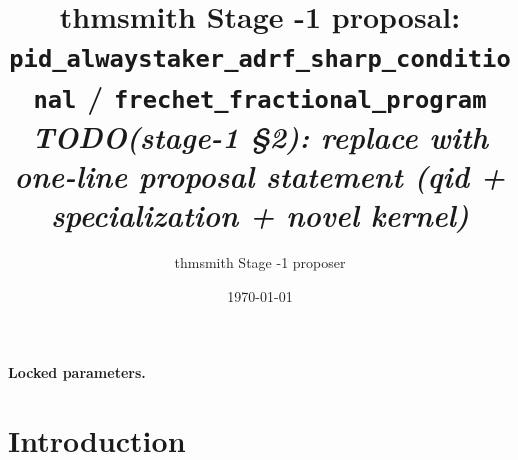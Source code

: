 \documentclass[11pt]{article}
\title{thmsmith Stage -1 proposal: \texttt{pid\_alwaystaker\_adrf\_sharp\_conditional} / \texttt{frechet\_fractional\_program}%
  \\ \large\textit{TODO(stage-1 \S2): replace with one-line proposal statement (qid + specialization + novel kernel)}}
\author{thmsmith Stage -1 proposer}
\date{\today}
\theoremstyle{definition}
\theoremstyle{plain}
\theoremstyle{remark}
\begin{document}
\maketitle


\paragraph{Locked parameters.}

\begin{abstract}
\end{abstract}

\section{Introduction}
%
%
%
%
\end{document}

